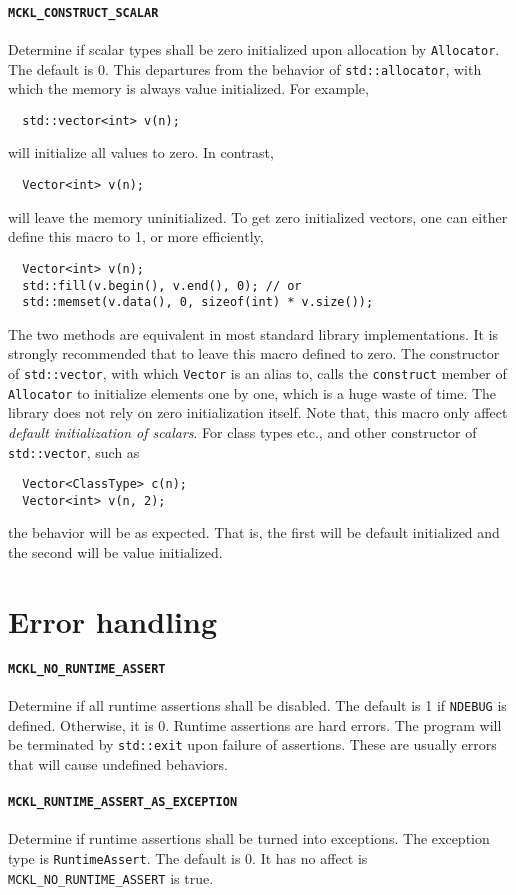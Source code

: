 \paragraph{\texttt{MCKL\_CONSTRUCT\_SCALAR}} Determine if scalar types shall be
zero initialized upon allocation by \verb|Allocator|. The default is 0. This
departures from the behavior of \verb|std::allocator|, with which the memory is
always value initialized. For example,
\begin{Verbatim}
  std::vector<int> v(n);
\end{Verbatim}
will initialize all values to zero. In contrast,
\begin{Verbatim}
  Vector<int> v(n);
\end{Verbatim}
will leave the memory uninitialized. To get zero initialized vectors, one can
either define this macro to 1, or more efficiently,
\begin{Verbatim}
  Vector<int> v(n);
  std::fill(v.begin(), v.end(), 0); // or
  std::memset(v.data(), 0, sizeof(int) * v.size());
\end{Verbatim}
The two methods are equivalent in most standard library implementations. It is
strongly recommended that to leave this macro defined to zero. The constructor
of \verb|std::vector|, with which \verb|Vector| is an alias to, calls the
\verb|construct| member of \verb|Allocator| to initialize elements one by one,
which is a huge waste of time. The library does not rely on zero initialization
itself. Note that, this macro only affect \emph{default initialization of
  scalars}. For class types etc., and other constructor of \verb|std::vector|,
such as
\begin{Verbatim}
  Vector<ClassType> c(n);
  Vector<int> v(n, 2);
\end{Verbatim}
the behavior will be as expected. That is, the first will be default
initialized and the second will be value initialized.

\section{Error handling}
\label{sec:Error handling}

\paragraph{\texttt{MCKL\_NO\_RUNTIME\_ASSERT}} Determine if all runtime
assertions shall be disabled. The default is 1 if \verb|NDEBUG| is defined.
Otherwise, it is 0. Runtime assertions are hard errors. The program will be
terminated by \verb|std::exit| upon failure of assertions. These are usually
errors that will cause undefined behaviors.

\paragraph{\texttt{MCKL\_RUNTIME\_ASSERT\_AS\_EXCEPTION}} Determine if runtime
assertions shall be turned into exceptions. The exception type is
\verb|RuntimeAssert|. The default is 0. It has no affect is
\verb|MCKL_NO_RUNTIME_ASSERT| is true.
